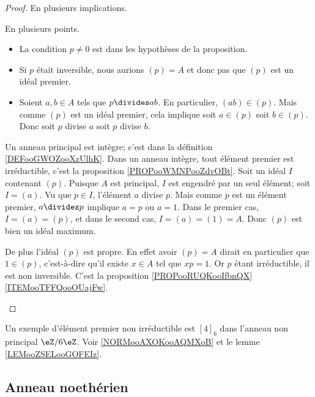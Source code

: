 \begin{proof}
	En plusieurs implications.
	\begin{subproof}
		En plusieurs points.
		\begin{itemize}
			\item La condition \( p\neq 0\) est dans les hypothèses de la proposition.
			\item Si \( p\) était inversible, nous aurions \( (p)=A\) et donc pas que \( (p)\) est un idéal premier.
			\item Soient \( a,b\in A\) tels que \( p\divides ab\). En particulier, \( (ab)\in (p)\). Mais comme \( (p)\) est un idéal premier, cela implique soit \( a\in (p)\) soit \( b\in (p)\). Donc soit \( p\) divise \( a\) soit \( p\) divise \( b\).
		\end{itemize}
		Un anneau principal est intègre; c'est dans la définition \ref{DEFooGWOZooXzUlhK}. Dans un anneau intègre, tout élément premier est irréductible, c'est la proposition \ref{PROPooWMNPooZdvOBt}.
		Soit un idéal \( I\) contenant \( (p)\). Puisque \( A\) est principal, \( I\) est engendré par un seul élément; soit \( I=(a)\). Vu que \( p\in I\), l'élément \( a\) divise \( p\). Mais comme \( p\) est un élément premier, \( a\divides p\) implique \( a=p\) ou \( a=1\). Dans le premier cas, \( I=(a)=(p)\), et dans le second cas, \( I=(a)=(1)=A\). Donc \( (p)\) est bien un idéal maximum.

		De plus l'idéal \( (p)\) est propre. En effet avoir \( (p)=A\) dirait en particulier que \( 1\in (p)\), c'est-à-dire qu'il existe \( x\in A\) tel que \( xp=1\). Or \( p\) étant irréductible, il est non inversible.
		C'est la proposition \ref{PROPooRUQKooIfbnQX}\ref{ITEMooTFFQooOUajFw}.
	\end{subproof}
\end{proof}

Un exemple d'élément premier non irréductible est \( [4]_6\) dans l'anneau non principal \( \eZ/6\eZ\). Voir \ref{NORMooAXOKooAQMXoB} et le lemme \ref{LEMooZSELooGOFEIz}.

\subsection{Anneau noethérien}


